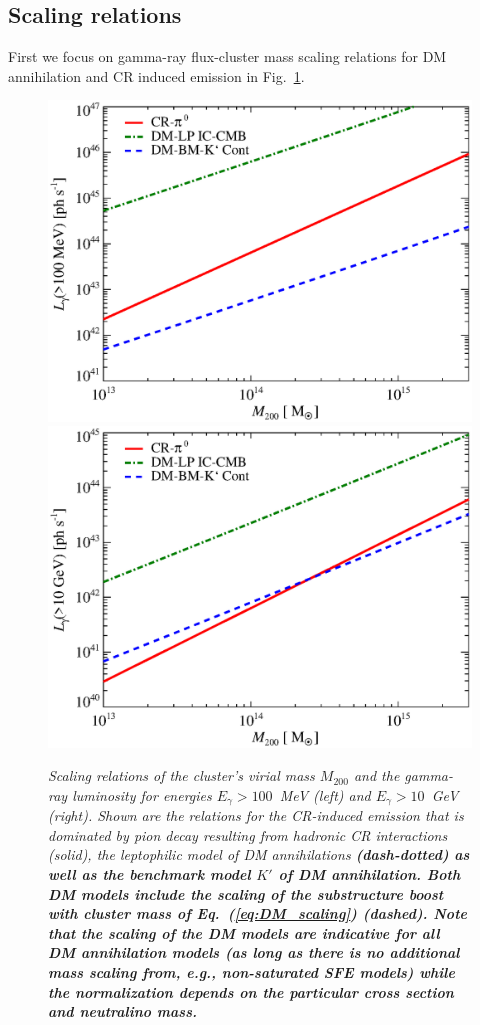 \documentclass[10pt,aps,pra,reprint,amsmath,amsfonts,amssymb,showpacs,nofootinbib,floatfix]{revtex4-1}
\def\C#1{{\bf #1}}
\newcommand{\mvir}{M_{200}}
\begin{document}
\subsection{Scaling relations}
First we focus on gamma-ray flux-cluster mass scaling relations for DM
annihilation and CR induced emission in
Fig.~\ref{fig:lum_mass_scaling}.  
\begin{figure}
  \includegraphics[width=0.99\columnwidth]{figures/MLscaling.100M.eps}
  \includegraphics[width=0.99\columnwidth]{figures/MLscaling.10G.eps}
  \caption{\it Scaling relations of the cluster's virial mass $\mvir$ and the
    gamma-ray luminosity for energies $E_\gamma>100$~MeV (left) and
    $E_\gamma>10$~GeV (right).  Shown are the relations for the CR-induced
    emission that is dominated by pion decay resulting from hadronic CR
    interactions (solid), the leptophilic model of DM annihilations
    \C{(dash-dotted) as well as the benchmark model $K'$ of DM
      annihilation. Both DM models include the scaling of the substructure boost
      with cluster mass of Eq.~(\ref{eq:DM_scaling}) (dashed). Note that the
      scaling of the DM models are indicative for all DM annihilation models (as
      long as there is no additional mass scaling from, e.g., non-saturated SFE
      models) while the normalization depends on the particular cross section
      and neutralino mass.}}
\label{fig:lum_mass_scaling}
\end{figure}
\end{document}
